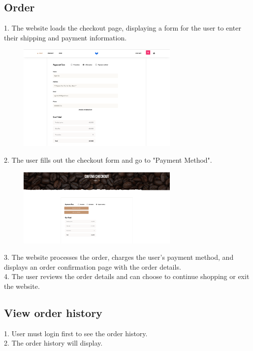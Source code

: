 \subsection{Order}
1. The website loads the checkout page, displaying a form for the user to enter their shipping and payment information. \\
\begin{figure}[H]
    \centering
    \includegraphics[width=0.7\textwidth]{Demo/Cart1.png}
    \label{fig:cart1page}
\end{figure}
2. The user fills out the checkout form and go to "Payment Method". 
\begin{figure}[H]
    \centering
    \includegraphics[width=0.7\textwidth]{Demo/Cart2.png}
    \label{fig:cart2page}
\end{figure}
3. The website processes the order, charges the user's payment method, and displays an order confirmation page with the order details. \\
4. The user reviews the order details and can choose to continue shopping or exit the website.
\subsection{View order history}
1. User must login first to see the order history.\\
2. The order history will display.